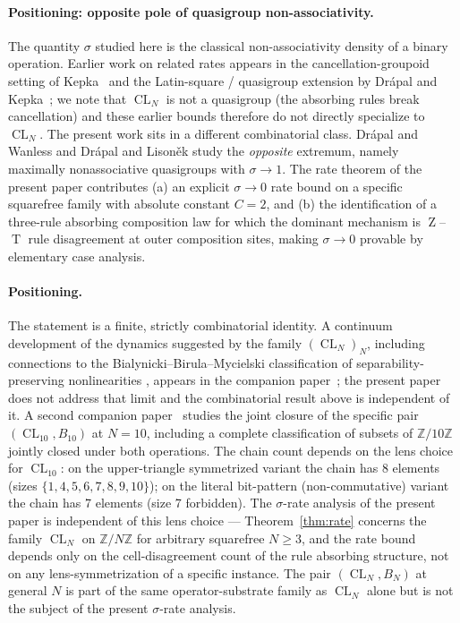 \documentclass[11pt,reqno]{amsart}
\theoremstyle{plain}
\theoremstyle{definition}
\theoremstyle{remark}
\DeclareMathOperator{\CL}{CL}
\DeclareMathOperator{\HARM}{T}
\DeclareMathOperator{\VOID}{Z}
\begin{document}
\paragraph{Positioning: opposite pole of quasigroup non-associativity.}
The quantity $\sigma$ studied here is the classical
non-associativity density of a binary operation. Earlier work on
related rates appears in the cancellation-groupoid setting of
Kepka~\cite{Kepka1980} and the Latin-square / quasigroup
extension by Dr\'{a}pal and Kepka~\cite{DrapalKepka1985}; we note
that $\CL_N$ is not a quasigroup (the absorbing rules break
cancellation) and these earlier bounds therefore do not directly
specialize to $\CL_N$. The present work sits in a different
combinatorial class.
Dr\'{a}pal and Wanless \cite{DrapalWanless2021} and
Dr\'{a}pal and Lison\v{e}k \cite{DrapalLisonek2020} study the
\emph{opposite} extremum, namely maximally nonassociative
quasigroups with $\sigma\to 1$. The rate theorem of the present paper
contributes (a) an explicit $\sigma\to 0$ rate bound on a specific
squarefree family with absolute constant $C=2$, and (b) the
identification of a three-rule absorbing composition law for which
the dominant mechanism is $\VOID$--$\HARM$ rule disagreement at outer
composition sites, making $\sigma\to 0$ provable by elementary case
analysis.

\paragraph{Positioning.}
The statement is a finite, strictly combinatorial identity. A
continuum development of the dynamics suggested by the family
$(\CL_N)_{N}$, including connections to the Bialynicki--Birula--Mycielski
classification of separability-preserving nonlinearities \cite{BB1976},
appears in the companion paper~\cite{SandersGish2026JCAP}; the
present paper does not address that limit and the combinatorial result
above is independent of it. A second companion
paper~\cite{SandersGish2026FourCore} studies the joint closure of the
specific pair $(\CL_{10}, B_{10})$ at $N=10$, including a complete
classification of subsets of $\mathbb{Z}/10\mathbb{Z}$ jointly closed
under both operations. The chain count depends on the lens choice for $\CL_{10}$: on the upper-triangle symmetrized variant the chain has 8 elements (sizes $\{1,4,5,6,7,8,9,10\}$); on the literal bit-pattern (non-commutative) variant the chain has 7 elements (size 7 forbidden). The $\sigma$-rate analysis of the present paper is independent of this lens choice — Theorem~\ref{thm:rate} concerns the family $\CL_N$ on $\mathbb{Z}/N\mathbb{Z}$ for arbitrary squarefree $N\ge 3$, and the rate bound depends only on the cell-disagreement count of the rule absorbing structure, not on any lens-symmetrization of a specific instance. The pair
$(\CL_N, B_N)$ at general $N$ is part of the same operator-substrate
family as $\CL_N$ alone but is not the subject of the present
$\sigma$-rate analysis.
\end{document}
